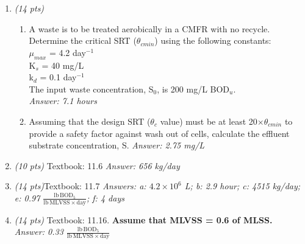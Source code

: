 \documentclass[12pt,letterpaper]{article}
\begin{document}
\begin{enumerate}
\item \emph{(14 pts)}
\begin{enumerate}

\item A waste is to be treated aerobically in a CMFR with no recycle. Determine the critical SRT ($\theta_{cmin}$) using the following constants:\\

$\mu_{max}$ = 4.2 day$^{-1}$\\
 
K$_s$ = 40 mg/L\\

k$_d$ = 0.1 day$^{-1}$\\
 
The input waste concentration, S$_0$, is 200 mg/L BOD$_u$.\\
\emph{Answer: 7.1 hours}
 
\item Assuming that the design SRT ($\theta_c$ value) must be at least 20$\times \theta_{cmin}$ to provide a safety factor against wash out of cells, calculate the effluent substrate concentration, S.  \emph{Answer: 2.75 mg/L}
\end{enumerate}

\item \emph{(10 pts)} Textbook: 11.6 \emph{Answer: 656 kg/day}
\item \emph{(14 pts)}Textbook: 11.7  \emph{Answers: a: $4.2\times 10^6$ L; b: 2.9 hour; c: 4515 kg/day; e: 0.97 $\mathrm{\frac{lb\, BOD_5}{lb\, MLVSS\times day}}$; f: 4 days}

\item \emph{(14 pts)} Textbook: 11.16.  \textbf{Assume that MLVSS = 0.6 of MLSS.}\\
\emph{Answer: 0.33 $\mathrm{\frac{lb\, BOD_5}{lb\, MLVSS\times day}}$}

\end{enumerate}
\end{document}
